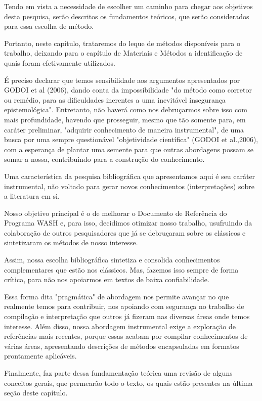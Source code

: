 Tendo em vista a necessidade de escolher um caminho para chegar  aos objetivos desta pesquisa, serão descritos os fundamentos teóricos, que serão considerados para essa escolha de método.

Portanto, neste capítulo, trataremos do leque de métodos disponíveis para o trabalho, deixando para o capítulo de Materiais e Métodos a identificação de quais foram efetivamente utilizados.

É preciso declarar que temos sensibilidade aos argumentos apresentados por GODOI et al (2006), dando conta da impossibilidade "do método como corretor ou remédio, para as dificuldades inerentes a uma inevitável insegurança epistemológica". Entretanto, não haverá como nos debruçarmos sobre isso com mais profundidade, havendo que prosseguir, mesmo que tão somente para, em caráter preliminar, "adquirir conhecimento de maneira instrumental", de uma busca por uma sempre questionável "objetividade científica" (GODOI et al.,2006), com a esperança de plantar uma semente para que outras abordagens possam se somar a nossa, contribuindo para a construção do conhecimento.

Uma característica da pesquisa bibliográfica que apresentamos aqui é seu  caráter instrumental, não voltado para gerar novos conhecimentos (interpretações) sobre a literatura em si.

Nosso objetivo principal é o de melhorar o Documento de Referência do Programa WASH e, para isso, decidimos otimizar nosso trabalho, usufruindo da colaboração de outros pesquisadores que já se debruçaram sobre os clássicos e  sintetizaram os métodos de nosso interesse.

Assim, nossa escolha bibliográfica sintetiza e consolida conhecimentos complementares que estão nos clássicos. Mas, fazemos isso sempre de forma crítica, para não nos apoiarmos em textos de baixa confiabilidade.

Essa forma dita "pragmática" de abordagem nos permite avançar no que realmente temos para contribuir, nos apoiando com segurança no trabalho de compilação e interpretação que outros já fizeram nas diversas áreas onde temos interesse. Além disso, nossa abordagem instrumental exige a exploração de referências mais recentes, porque essas acabam por compilar conhecimentos de várias áreas, apresentando descrições de métodos encapsuladas em formatos prontamente aplicáveis.

Finalmente, faz parte dessa fundamentação teórica uma revisão de alguns conceitos gerais, que permearão todo o texto, os quais estão presentes na última seção deste capítulo.

